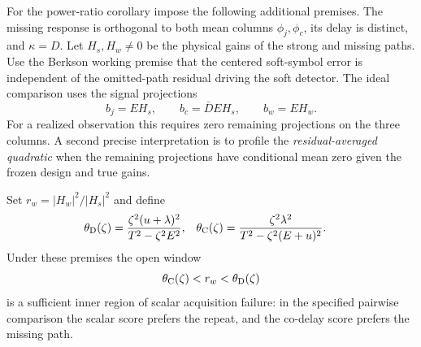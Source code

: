 For the power-ratio corollary impose the following additional premises.
The missing response is orthogonal to both mean columns $\phi_j,\phi_c$,
its delay is distinct, and $\kappa=D$. Let $H_s,H_w\ne0$ be the
physical gains of the strong and missing paths. Use the Berkson
working premise that the centered soft-symbol error is independent of
the omitted-path residual driving the soft detector. The ideal comparison
uses the signal projections
\begin{equation}
 b_j=EH_s,\qquad b_c=\bar D EH_s,\qquad b_w=EH_w.        \label{eq:af-ideal-projections}
\end{equation}
For a realized observation this requires zero remaining projections
on the three columns. A second precise interpretation is to profile
the \emph{residual-averaged quadratic} when the remaining projections
have conditional mean zero given the frozen design and true gains.

Set $r_w=|H_w|^2/|H_s|^2$ and define
\begin{align}
 \theta_{\rm D}(\zeta)
 &=\frac{\zeta^2(u+\lambda)^2}{T^2-\zeta^2E^2},&
 \theta_{\rm C}(\zeta)
 &=\frac{\zeta^2\lambda^2}{T^2-\zeta^2(E+u)^2}.
 \label{eq:af-window}
\end{align}
Under these premises the open window
\[
             \theta_{\rm C}(\zeta)<r_w<\theta_{\rm D}(\zeta)
\]
is a sufficient inner region of scalar acquisition failure: in the
specified pairwise comparison the scalar score prefers the repeat, and
the co-delay score prefers the missing path.

